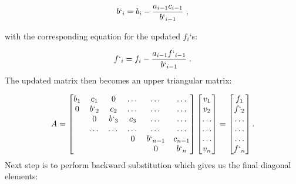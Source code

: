 \documentclass[english,a4paper, 11pt]{article}
\begin{document}
\begin{equation}
b`_i = b_i - \frac{a_{i-1}c_{i-1}}{b`_{i-1}}\;,
\label{Forwardb}
\end{equation}

with the corresponding equation for the updated $f_i$`s:

\begin{equation}
f`_i = f_i - \frac{a_{i-1}f`_{i-1}}{b`_{i-1}}\;.
\label{Forwardf}
\end{equation}
 The updated matrix then becomes an upper triangular matrix:
 
 $$
    A = \begin{bmatrix}
                           b_1& c_1 & 0 &\dots   & \dots &\dots \\
                           0 & b`_2 & c_2 &\dots &\dots &\dots \\
                           & 0& b`_3 & c_3 & \dots & \dots \\
                           & \dots   & \dots &\dots   &\dots & \dots \\
                           &   &  &0  &b`_{n-1}& c_{n-1} \\
                           &    &  &   &0& b`_n \\
                      \end{bmatrix}\begin{bmatrix}
                           v_1\\
                           v_2\\
                           \dots \\
                          \dots  \\
                          \dots \\
                           v_n\\
                      \end{bmatrix}
  =\begin{bmatrix}
                           f_1\\
                           f`_2\\
                           \dots \\
                           \dots \\
                          \dots \\
                           f`_n\\
                      \end{bmatrix}.
$$
Next step is to perform backward substitution which gives us the final diagonal elements:
\end{document}
